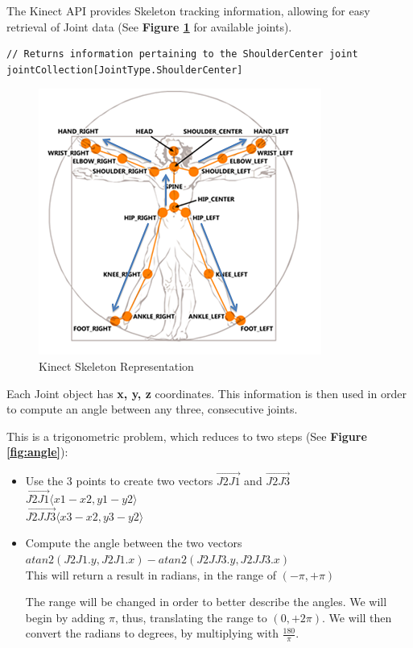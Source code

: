 \documentclass[12p,a4paper]{report}
\begin{document}
The Kinect API provides Skeleton tracking information, allowing for easy retrieval of Joint data (See \textbf{Figure \ref{fig:kinectbody}} for available joints). 

\begin{verbatim}
// Returns information pertaining to the ShoulderCenter joint
jointCollection[JointType.ShoulderCenter]
\end{verbatim}

\begin{figure}[H]
\begin{center}
\includegraphics{kinectbody2}
\caption{Kinect Skeleton Representation \cite{mocapsports}}
\label{fig:kinectbody}
\end{center}
\end{figure}

Each Joint object has \textbf{x, y, z} coordinates. This information is then used in order to compute an angle between any three, consecutive joints.

This is a trigonometric problem, which reduces to two steps (See \textbf{Figure \ref{fig:angle}}):

\begin{itemize}
\item Use the 3 points to create two vectors $\overrightarrow{J2J1}$ and $\overrightarrow{J2J3}$ \\
$
\overrightarrow{J2J1} \langle x1 -  x2, y1 - y2 \rangle 
$ \vspace{5pt} \\
$
\overrightarrow{J2JJ3} \langle x3 -  x2, y3 - y2 \rangle
$


\item Compute the angle between the two vectors \\

$atan2(J2J1.y, J2J1.x) - atan2(J2JJ3.y,  J2JJ3.x)
$ \\

This will return a result in radians, in the range of $(-\pi,+\pi)$

The range will be changed in order to better describe the angles. We will begin by adding $\pi$, thus, translating the range to $(0,+2\pi)$. We will then convert the radians to degrees, by multiplying with $\frac{180}{\pi}$.

\end{itemize}
\end{document}
